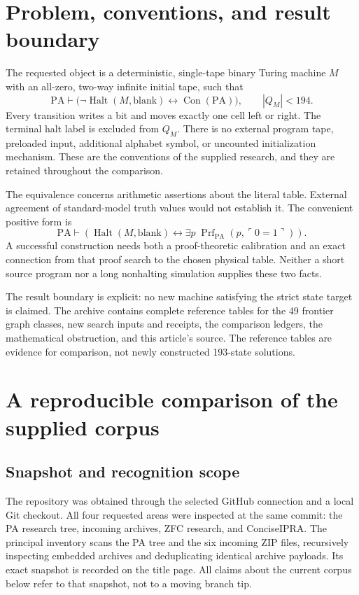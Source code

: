 \documentclass[11pt,letterpaper]{article}
\newcommand{\PA}{\mathrm{PA}}
\newcommand{\Con}{\operatorname{Con}}
\newcommand{\Halt}{\operatorname{Halt}}
\newcommand{\Prf}{\operatorname{Prf}}
\begin{document}
\section{Problem, conventions, and result boundary}

The requested object is a deterministic, single-tape binary Turing machine
$M$ with an all-zero, two-way infinite initial tape, such that
\[
 \PA\vdash\bigl(\neg\Halt(M,\mathrm{blank})\leftrightarrow\Con(\PA)\bigr),
 \qquad |Q_M|<194.
\]
Every transition writes a bit and moves exactly one cell left or right.
The terminal halt label is excluded from $Q_M$. There is no external
program tape, preloaded input, additional alphabet symbol, or uncounted
initialization mechanism. These are the conventions of the supplied
research, and they are retained throughout the comparison.

The equivalence concerns arithmetic assertions about the literal table.
External agreement of standard-model truth values would not establish it.
The convenient positive form is
\[
 \PA\vdash\left(\Halt(M,\mathrm{blank})\leftrightarrow
 \exists p\;\Prf_{\PA}(p,\ulcorner0=1\urcorner)\right).
 \tag{1}
\]
A successful construction needs both a proof-theoretic calibration and an
exact connection from that proof search to the chosen physical table.
Neither a short source program nor a long nonhalting simulation supplies
these two facts.

The result boundary is explicit: no new machine satisfying the strict
state target is claimed. The archive contains complete reference tables
for the 49 frontier graph classes, new search inputs and receipts, the
comparison ledgers, the mathematical obstruction, and this article's source.
The reference tables are evidence for comparison, not newly constructed
193-state solutions.

\section{A reproducible comparison of the supplied corpus}
\label{sec:census}

\subsection{Snapshot and recognition scope}

The repository was obtained through the selected GitHub connection and a
local Git checkout. All four requested areas were inspected at the same
commit: the PA research tree, incoming archives, ZFC research, and
ConciseIPRA. The principal inventory scans the PA tree and the six incoming
ZIP files, recursively inspecting embedded archives and deduplicating
identical archive payloads. Its exact snapshot is recorded on the title
page. All claims about the current corpus below refer to that snapshot,
not to a moving branch tip.
\end{document}
